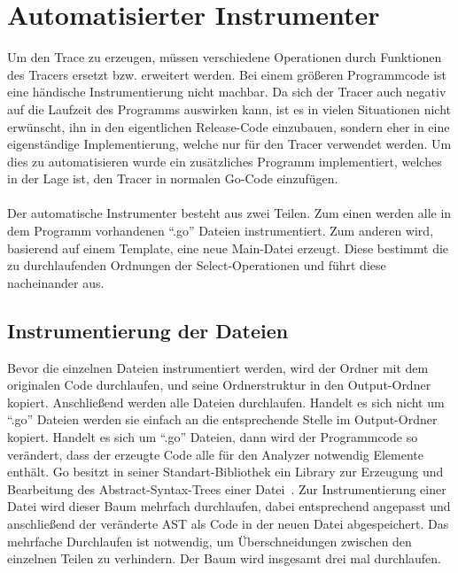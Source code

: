 \section{Automatisierter Instrumenter}\label{Chap:Instrumenter-Sec:Instrumenter}
Um den Trace zu erzeugen, müssen verschiedene Operationen durch Funktionen
des Tracers ersetzt bzw. erweitert werden. Bei einem größeren 
Programmcode ist eine händische Instrumentierung nicht machbar.
Da sich der Tracer auch negativ auf die Laufzeit des Programms 
auswirken kann, ist es in vielen Situationen nicht erwünscht, ihn in den 
eigentlichen Release-Code einzubauen, sondern eher in eine eigenständige 
Implementierung, welche nur für den Tracer verwendet werden. Um dies zu
automatisieren wurde ein zusätzliches Programm implementiert, welches in der 
Lage ist, den Tracer in normalen Go-Code einzufügen.\\\\

Der automatische Instrumenter besteht aus zwei Teilen. 
Zum einen werden alle 
in dem Programm vorhandenen ``.go'' Dateien instrumentiert. 
Zum anderen 
wird, basierend auf einem Template, eine neue Main-Datei erzeugt.
Diese bestimmt die zu durchlaufenden Ordnungen der Select-Operationen 
und führt diese nacheinander aus. 

\subsection{Instrumentierung der Dateien}
Bevor die einzelnen Dateien instrumentiert werden, wird der Ordner mit 
dem originalen Code durchlaufen, und seine Ordnerstruktur in den 
Output-Ordner kopiert. Anschließend werden alle Dateien durchlaufen.
Handelt es sich nicht um ``.go'' Dateien werden sie einfach an die entsprechende 
Stelle im Output-Ordner kopiert. Handelt es sich um ``.go'' Dateien, dann wird 
der Programmcode so verändert, dass der erzeugte Code alle für den Analyzer 
notwendig Elemente enthält. Go besitzt in seiner Standart-Bibliothek ein 
Library zur Erzeugung und Bearbeitung des Abstract-Syntax-Trees einer 
Datei~\cite{ast-spec}. Zur Instrumentierung einer Datei wird dieser Baum 
mehrfach durchlaufen, dabei entsprechend angepasst und anschließend der 
veränderte AST als Code in der neuen Datei abgespeichert. Das mehrfache Durchlaufen 
ist notwendig, um Überschneidungen zwischen den einzelnen Teilen zu verhindern.
Der Baum wird insgesamt drei mal durchlaufen.
